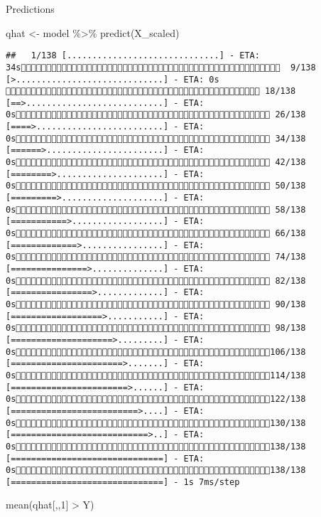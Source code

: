 \documentclass[
  ignorenonframetext,
]{beamer}
\newenvironment{Shaded}{\begin{snugshade}}{\end{snugshade}}
\newcommand{\DecValTok}[1]{\textcolor[rgb]{0.00,0.00,0.81}{#1}}
\newcommand{\FunctionTok}[1]{\textcolor[rgb]{0.00,0.00,0.00}{#1}}
\newcommand{\NormalTok}[1]{#1}
\newcommand{\OtherTok}[1]{\textcolor[rgb]{0.56,0.35,0.01}{#1}}
\newcommand{\SpecialCharTok}[1]{\textcolor[rgb]{0.00,0.00,0.00}{#1}}
\begin{document}
\begin{frame}[fragile]{Predictions}
\protect\hypertarget{predictions}{}
\begin{Shaded}
\begin{Highlighting}[]
\NormalTok{qhat }\OtherTok{\textless{}{-}}\NormalTok{ model }\SpecialCharTok{\%\textgreater{}\%} \FunctionTok{predict}\NormalTok{(X\_scaled)}
\end{Highlighting}
\end{Shaded}

\begin{verbatim}
##   1/138 [..............................] - ETA: 34s  9/138 [>.............................] - ETA: 0s  18/138 [==>...........................] - ETA: 0s 26/138 [====>.........................] - ETA: 0s 34/138 [======>.......................] - ETA: 0s 42/138 [========>.....................] - ETA: 0s 50/138 [=========>....................] - ETA: 0s 58/138 [===========>..................] - ETA: 0s 66/138 [=============>................] - ETA: 0s 74/138 [===============>..............] - ETA: 0s 82/138 [================>.............] - ETA: 0s 90/138 [==================>...........] - ETA: 0s 98/138 [====================>.........] - ETA: 0s106/138 [======================>.......] - ETA: 0s114/138 [=======================>......] - ETA: 0s122/138 [=========================>....] - ETA: 0s130/138 [===========================>..] - ETA: 0s138/138 [==============================] - ETA: 0s138/138 [==============================] - 1s 7ms/step
\end{verbatim}

\begin{Shaded}
\begin{Highlighting}[]
\FunctionTok{mean}\NormalTok{(qhat[,,}\DecValTok{1}\NormalTok{] }\SpecialCharTok{\textgreater{}}\NormalTok{ Y)}
\end{Highlighting}
\end{Shaded}


\end{frame}
\end{document}
